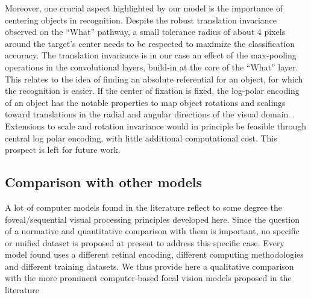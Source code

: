 Moreover, one crucial aspect highlighted by our model is the importance of centering objects in recognition. Despite the robust translation invariance observed on the ``What'' pathway, a small tolerance radius of about $4$ pixels around the target's center needs to be respected to maximize the classification accuracy. The translation invariance is in our case an effect of the max-pooling operations in the convolutional layers, build-in at the core of the ``What'' layer.
This relates to the idea of finding an absolute referential for an object, for which the recognition is easier. If the center of fixation is fixed, the log-polar encoding of an object has the notable properties to map object rotations and scalings toward translations in the radial and angular directions of the visual domain~\cite{Traver10}. Extensions to scale and rotation invariance would in principle be feasible through central log polar encoding, with little additional  computational cost. This prospect is left for future work.



\subsection{Comparison with other models}

A lot of computer models found in the literature reflect to some degree the foveal/sequential visual processing principles developed here.
Since the question of a normative and quantitative comparison with them is important, no specific or unified dataset is proposed at present
to address this specific case. Every model found uses a different retinal encoding, different computing methodologies and different training datasets.
We thus provide here a qualitative comparison with the more prominent  computer-based focal vision models proposed in the literature




